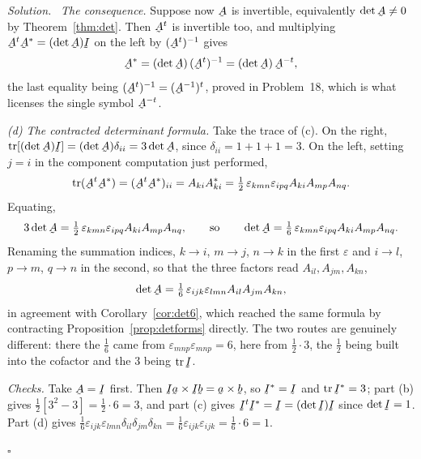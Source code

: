 \documentclass[17pt,a4paper]{extreport}
\DeclareRobustCommand{\vek}[1]{\underaccent{\tilde}{#1}}
\newcommand{\tr}{\operatorname{tr}}
\newcommand{\I}{\vek{I}}
\newcommand{\ba}{\vek{a}}
\newcommand{\bb}{\vek{b}}
\newcommand{\bA}{\vek{A}}
\newcommand{\dd}{\delta}
\newcommand{\eps}{\varepsilon}
\theoremstyle{scplain}
\theoremstyle{scdefn}
\theoremstyle{scplain}
\newenvironment{solution}
 {\par\smallskip\noindent\textit{Solution.}\ }
 {\hfill$\square$\par\medskip}
\begin{document}
\begin{solution}
\emph{The consequence.} Suppose now $\bA$ is invertible, equivalently
$\det\bA\neq0$ by Theorem~\ref{thm:det}. Then $\bA^{t}$ is invertible too,
and multiplying $\bA^{t}\bA^{*}=(\det\bA)\I$ on the left by $(\bA^{t})^{-1}$
gives
\[
   \bA^{*}=(\det\bA)\,(\bA^{t})^{-1}=(\det\bA)\,\bA^{-t},
\]
the last equality being $(\bA^{t})^{-1}=(\bA^{-1})^{t}$, proved in
Problem~18, which is what licenses the single symbol $\bA^{-t}$.

\medskip
\emph{(d) The contracted determinant formula.}
Take the trace of (c). On the right, $\tr[(\det\bA)\I]=(\det\bA)\dd_{ii}
=3\det\bA$, since $\dd_{ii}=1+1+1=3$. On the left, setting $j=i$ in the
component computation just performed,
\[
   \tr(\bA^{t}\bA^{*})=(\bA^{t}\bA^{*})_{ii}=A_{ki}A^{*}_{ki}
   =\tfrac12\,\eps_{kmn}\eps_{ipq}A_{ki}A_{mp}A_{nq}.
\]
Equating,
\[
   3\det\bA=\tfrac12\,\eps_{kmn}\eps_{ipq}A_{ki}A_{mp}A_{nq},
   \qquad\text{so}\qquad
   \det\bA=\tfrac16\,\eps_{kmn}\eps_{ipq}A_{ki}A_{mp}A_{nq}.
\]
Renaming the summation indices, $k\to i$, $m\to j$, $n\to k$ in the first
$\eps$ and $i\to l$, $p\to m$, $q\to n$ in the second, so that the three
factors read $A_{il},A_{jm},A_{kn}$,
\[
   \det\bA=\tfrac16\,\eps_{ijk}\eps_{lmn}A_{il}A_{jm}A_{kn},
\]
in agreement with Corollary~\ref{cor:det6}, which reached the same formula
by contracting Proposition~\ref{prop:detforms} directly. The two routes are
genuinely different: there the $\tfrac16$ came from
$\eps_{mnp}\eps_{mnp}=6$, here from $\tfrac12\cdot 3$, the $\tfrac12$ being
built into the cofactor and the $3$ being $\tr\I$.

\medskip
\emph{Checks.} Take $\bA=\I$ first. Then $\I\ba\times\I\bb=\ba\times\bb$, so
$\I^{*}=\I$ and $\tr\I^{*}=3$; part (b) gives
$\tfrac12[3^{2}-3]=\tfrac12\cdot 6=3$, and part (c) gives
$\I^{t}\I^{*}=\I=(\det\I)\I$ since $\det\I=1$. Part (d) gives
$\tfrac16\eps_{ijk}\eps_{lmn}\dd_{il}\dd_{jm}\dd_{kn}
=\tfrac16\eps_{ijk}\eps_{ijk}=\tfrac16\cdot 6=1$.


\end{solution}
\end{document}
